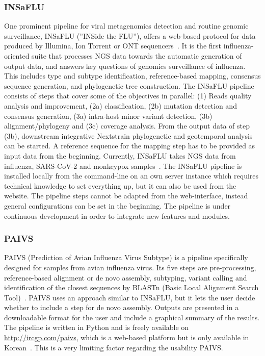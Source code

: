 \subsubsection{INSaFLU}
One prominent pipeline for viral metagenomics detection and routine genomic surveillance, INSaFLU (''INSide the FLU''), offers a web-based protocol for data produced by Illumina, Ion Torrent or ONT sequencers~\cite{borges2018insaflu}. It is the first influenza-oriented suite that processes NGS data towards the automatic generation of output data, and answers key questions of genomics surveillance of influenza. This includes type and subtype identification, reference-based mapping, consensus sequence generation, and phylogenetic tree construction. The INSaFLU pipeline consists of steps that cover some of the objectives in parallel: (1) Reads quality analysis and improvement, (2a) classification, (2b) mutation detection and consensus generation, (3a) intra-host minor variant detection, (3b) alignment/phylogeny and (3c) coverage analysis. From the output data of step (3b), downstream integrative Nextstrain phylogenetic and geotemporal analysis can be started. A reference sequence for the mapping step has to be provided as input data from the beginning. Currently, INSaFLU takes NGS data from influenza, SARS-CoV-2 and monkeypox samples~\cite{borges2018insaflu}. The INSaFLU pipeline is installed locally from the command-line on an own server instance which requires technical knowledge to set everything up, but it can also be used from the website. The pipeline steps cannot be adapted from the web-interface, instead general configurations can be set in the beginning. The pipeline is under continuous development in order to integrate new features and modules.

\subsubsection{PAIVS}
PAIVS (Prediction of Avian Influenza Virus Subtype) is a pipeline specifically designed for samples from avian influenza virus. Its five steps are pre-processing, reference-based alignment or de novo assembly, subtyping, variant calling and identification of the closest sequences by BLASTn (Basic Local Alignment Search Tool)~\cite{park2020paivs}. PAIVS uses an approach similar to INSaFLU, but it lets the user decide whether to include a step for de novo assembly. Outputs are presented in a downloadable format for the user and include a graphical summary of the results.
The pipeline is written in Python and is freely available on \url{http://ircgp.com/paivs}, which is a web-based platform but is only available in Korean~\cite{park2020paivs}. This is a very limiting factor regarding the usability PAIVS.


